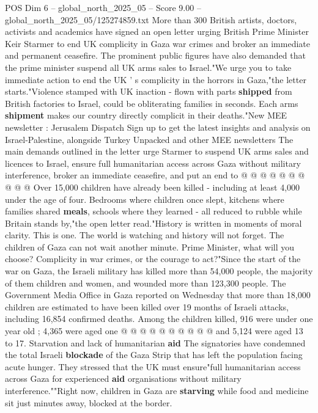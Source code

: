 \begin{textsample}{POS Dim 6 – global\_north\_2025\_05 – Score 9.00 – global\_north\_2025\_05/125274859.txt}  \label{ex:f6_pos_068}
More than 300 British artists, doctors, activists and academics have signed an open letter urging British Prime Minister Keir Starmer to end UK complicity in Gaza war crimes and broker an immediate and permanent ceasefire.
The prominent public figures have also demanded that the prime minister suspend all UK arms sales to Israel."We urge you to take immediate action to end the UK ' s complicity in the horrors in Gaza,"the letter starts."Violence stamped with UK inaction - flown with parts \textbf{shipped} from British factories to Israel, could be obliterating families in seconds.
Each arms \textbf{shipment} makes our country directly complicit in their deaths."New MEE newsletter : Jerusalem Dispatch Sign up to get the latest insights and analysis on Israel-Palestine, alongside Turkey Unpacked and other MEE newsletters The main demands outlined in the letter urge Starmer to suspend UK arms sales and licences to Israel, ensure full humanitarian access across Gaza without military interference, broker an immediate ceasefire, and put an end to @ @ @ @ @ @ @ @ @ @ Over 15,000 children have already been killed - including at least 4,000 under the age of four.
Bedrooms where children once slept, kitchens where families shared \textbf{meals}, schools where they learned - all reduced to rubble while Britain stands by,"the open letter read."History is written in moments of moral clarity.
This is one.
The world is watching and history will not forget.
The children of Gaza can not wait another minute.
Prime Minister, what will you choose?
Complicity in war crimes, or the courage to act?"Since the start of the war on Gaza, the Israeli military has killed more than 54,000 people, the majority of them children and women, and wounded more than 123,300 people.
The Government Media Office in Gaza reported on Wednesday that more than 18,000 children are estimated to have been killed over 19 months of Israeli attacks, including 16,854 confirmed deaths.
Among the children killed, 916 were under one year old ; 4,365 were aged one @ @ @ @ @ @ @ @ @ @ and 5,124 were aged 13 to 17.
Starvation and lack of humanitarian \textbf{aid} The signatories have condemned the total Israeli \textbf{blockade} of the Gaza Strip that has left the population facing acute hunger.
They stressed that the UK must ensure"full humanitarian access across Gaza for experienced \textbf{aid} organisations without military interference.""Right now, children in Gaza are \textbf{starving} while food and medicine sit just minutes away, blocked at the border.

\end{textsample}

